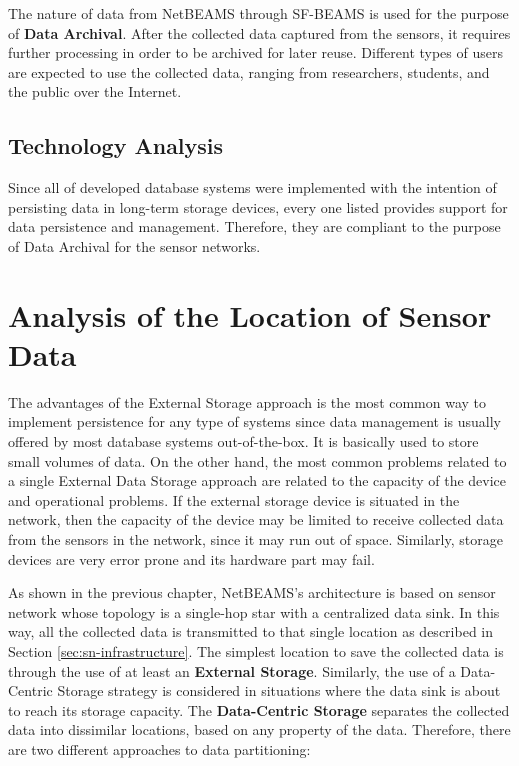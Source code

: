 The nature of data from NetBEAMS through SF-BEAMS is used for the purpose of
\textbf{Data Archival}. After the collected data captured from the sensors, it
requires further processing in order to be archived for later reuse. Different
types of users are expected to use the collected data, ranging from
researchers, students, and the public over the Internet.

\subsection{Technology Analysis}

Since all of developed database systems were implemented with the intention of
persisting data in long-term storage devices, every one listed provides
support for data persistence and management. Therefore, they are compliant to
the purpose of Data Archival for the sensor networks.

\section{Analysis of the Location of Sensor Data}
\label{sec:sn-data-location}

The advantages of the External Storage approach is the most common way to
implement persistence for any type of systems since data management is usually
offered by most database systems out-of-the-box. It is basically used to store
small volumes of data. On the other hand, the most common problems related to a
single External Data Storage approach are related to the capacity of the
device and operational problems. If the external storage device is situated in
the network, then the capacity of the device may be limited to receive
collected data from the sensors in the network, since it may run out of space.
Similarly, storage devices are very error prone and its hardware part may fail.

As shown in the previous chapter, NetBEAMS's architecture is based on sensor
network whose topology is a single-hop star with a centralized data sink. In
this way, all the collected data is transmitted to that single location as
described in Section \ref{sec:sn-infrastructure}. The simplest location to save
the collected data is through the use of at least an \textbf{External
Storage}. Similarly, the use of a Data-Centric Storage strategy is considered
in situations where the data sink is about to reach its storage capacity. The
\textbf{Data-Centric Storage} separates the collected data into dissimilar
locations, based on any property of the data. Therefore,
there are two different approaches to data partitioning:

